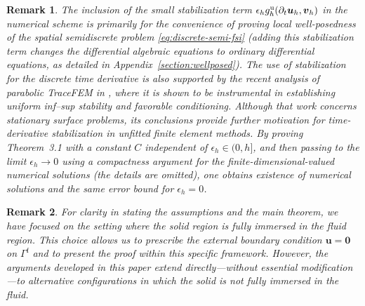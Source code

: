 \documentclass[11pt,reqno]{amsart}
\theoremstyle{definition}
\theoremstyle{plain}
\newtheorem{remark}{Remark}[section]
\numberwithin{theorem}{section}
\numberwithin{proposition}{section}
\numberwithin{lemma}{section}
\numberwithin{equation}{section}
\newcommand{\bs}[1]{\boldsymbol{#1}}
\newcommand{\uu}[1]  {{\bs{#1}} }
\newcommand{\bv}{{\bs v}}
\newcommand{\bu}{\uu{u}}
\renewcommand{\(}{\bigl(}
\renewcommand{\)}{\bigr)}
\begin{document}
\begin{remark}\label{remark-epsilonh}\upshape
The inclusion of the small stabilization term
$\epsilon_h g_h^{\rm u} (\partial_t\bu_h,\bv_h )$ in the numerical scheme is primarily for the convenience of proving local well-posedness of the spatial semidiscrete problem \eqref{eq:discrete-semi-fsi} (adding this stabilization term changes the differential algebraic equations to ordinary differential equations, as detailed  in Appendix~\ref{section:wellposed}). The use of stabilization for the discrete time derivative is also supported by the recent analysis of parabolic TraceFEM in \cite{Bouck-Nochetto-Shakipov-Yushutin-2026}, where it is shown to be instrumental in establishing uniform inf--sup stability and favorable conditioning. Although that work concerns stationary surface problems, its conclusions provide further motivation for time-derivative stabilization in unfitted finite element methods. By proving Theorem~3.1 with a constant $C$ independent of $\epsilon_h\in(0,h]$, and then passing to the limit $\epsilon_h\to0$ using a compactness argument for the finite-dimensional-valued numerical solutions (the details are omitted), one obtains existence of numerical solutions and the same error bound for $\epsilon_h=0$.
\end{remark}

\begin{remark}\upshape\label{remark1_THM}\upshape 
For clarity in stating the assumptions and the main theorem, we have focused on the setting where the solid region is fully immersed in the fluid region. This choice allows us to prescribe the external boundary condition $\boldsymbol{u}=\bs 0$ on $\Gamma^{\mathrm{f}}$ and to present the proof within this specific framework. However, the arguments developed in this paper extend directly---without essential modification---to alternative configurations in which the solid is not fully immersed in the fluid. 
\end{remark}

\end{document}
